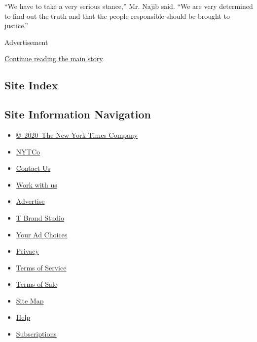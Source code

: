 ``We have to take a very serious stance,'' Mr. Najib said. ``We are very
determined to find out the truth and that the people responsible should
be brought to justice.''

Advertisement

\protect\hyperlink{after-bottom}{Continue reading the main story}

\hypertarget{site-index}{%
\subsection{Site Index}\label{site-index}}

\hypertarget{site-information-navigation}{%
\subsection{Site Information
Navigation}\label{site-information-navigation}}

\begin{itemize}
\tightlist
\item
  \href{https://help.nytimes3xbfgragh.onion/hc/en-us/articles/115014792127-Copyright-notice}{©~2020~The
  New York Times Company}
\end{itemize}

\begin{itemize}
\tightlist
\item
  \href{https://www.nytco.com/}{NYTCo}
\item
  \href{https://help.nytimes3xbfgragh.onion/hc/en-us/articles/115015385887-Contact-Us}{Contact
  Us}
\item
  \href{https://www.nytco.com/careers/}{Work with us}
\item
  \href{https://nytmediakit.com/}{Advertise}
\item
  \href{http://www.tbrandstudio.com/}{T Brand Studio}
\item
  \href{https://www.nytimes3xbfgragh.onion/privacy/cookie-policy\#how-do-i-manage-trackers}{Your
  Ad Choices}
\item
  \href{https://www.nytimes3xbfgragh.onion/privacy}{Privacy}
\item
  \href{https://help.nytimes3xbfgragh.onion/hc/en-us/articles/115014893428-Terms-of-service}{Terms
  of Service}
\item
  \href{https://help.nytimes3xbfgragh.onion/hc/en-us/articles/115014893968-Terms-of-sale}{Terms
  of Sale}
\item
  \href{https://spiderbites.nytimes3xbfgragh.onion}{Site Map}
\item
  \href{https://help.nytimes3xbfgragh.onion/hc/en-us}{Help}
\item
  \href{https://www.nytimes3xbfgragh.onion/subscription?campaignId=37WXW}{Subscriptions}
\end{itemize}

